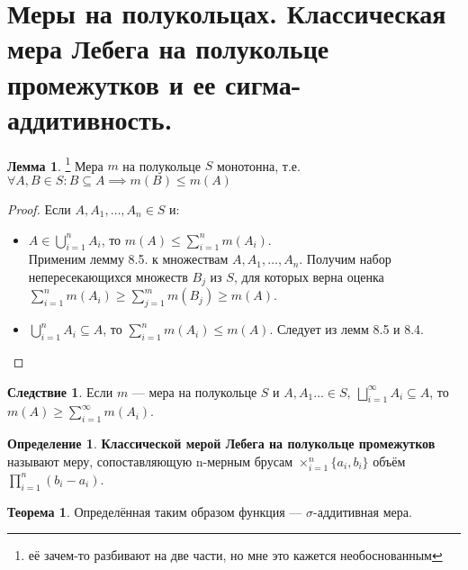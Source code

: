 \documentclass[11pt,a4paper]{report}
\theoremstyle{definition}
\theoremstyle{definition}
\newtheorem{theorem}{Теорема}[section]
\newtheorem{lemma}{Лемма}[section]
\newtheorem{corollary}{Следствие}[section]
\theoremstyle{definition}
\newtheorem{definition}{Определение}[section]
\begin{document}
	\section{Меры на полукольцах. Классическая мера Лебега на полукольце промежутков и ее сигма-аддитивность.}
	\begin{lemma}\footnote{её зачем-то разбивают на две части, но мне это кажется необоснованным}
		Мера $ m $ на полукольце $ S $ монотонна, т.е. $ \forall A, B \in S: B \subseteq A \implies m(B) \le m(A) $
	\end{lemma}
	\begin{proof}
		Если $ A, A_{1}, \dots, A_{n} \in S $ и:
		\begin{itemize}
			\item $ A \in \bigcup_{i=1}^{n}{A_{i}} $, то $ m(A) \le \sum_{i=1}^{n}{m(A_{i})} $.\\ 
			Применим лемму 8.5. к множествам $ A, A_{1}, \dots, A_{n} $. Получим набор непересекающихся множеств $ B_{j} $ из $ S $, для которых верна оценка $ \sum_{i=1}^{n}{m(A_{i})} \ge \sum_{j=1}^{m}{m(B_{j})}  \ge m(A) $.
			\item $ \bigcup_{i=1}^{n}{A_{i}} \subseteq A $, то $ \sum_{i=1}^{n}{m(A_{i})} \le m(A) $. Следует из лемм 8.5 и 8.4.
		\end{itemize}
	\end{proof}
	\begin{corollary}
		Если $ m $ — мера на полукольце $ S $ и $ A, A_{1} \dots \in S,\ \bigsqcup_{i=1}^{\infty}{A_{i}} \subseteq A $, то $ m(A) \ge \sum_{i=1}^{\infty}{m(A_{i})} $. 
	\end{corollary}
	\begin{definition}
		\textbf{Классической мерой Лебега на полукольце промежутков} называют меру, сопоставляющую n-мерным брусам $ \times_{i=1}^{n} \{a_{i}, b_{i}\} $ объём $ \prod_{i=1}^{n}{(b_{i} - a_{i})} $.
	\end{definition}
	\begin{theorem}
		Определённая таким образом функция — $ \sigma $-аддитивная мера.
	\end{theorem}
\end{document}
